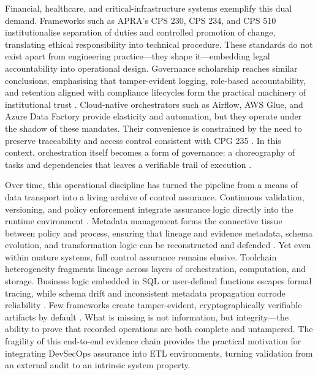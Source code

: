 Financial, healthcare, and critical-infrastructure systems exemplify this dual
demand. Frameworks such as APRA’s CPS 230, CPS 234, and CPS 510
\cite{cps230, cps234, cps510} institutionalise separation of duties and
controlled promotion of change, translating ethical responsibility into
technical procedure. These standards do not exist apart from engineering
practice—they shape it—embedding legal accountability into operational design.
Governance scholarship reaches similar conclusions, emphasising that
tamper-evident logging, role-based accountability, and retention aligned with
compliance lifecycles form the practical machinery of institutional trust
\cite{elbaghazaoui_ensuring_2025, elbaghazaoui_metadata_2025,
elbaghazaoui_data_2025}. Cloud-native orchestrators such as Airflow, AWS Glue,
and Azure Data Factory provide elasticity and automation, but they operate under
the shadow of these mandates. Their convenience is constrained by the need to
preserve traceability and access control consistent with CPG 235
\cite{australian_prudential_regulation_authority_prudential_2013}. In this
context, orchestration itself becomes a form of governance: a choreography of
tasks and dependencies that leaves a verifiable trail of execution
\cite{pogiatzis_event-driven_2021}.

Over time, this operational discipline has turned the pipeline from a means of
data transport into a living archive of control assurance. Continuous
validation, versioning, and policy enforcement integrate assurance logic
directly into the runtime environment \cite{elbaghazaoui_ensuring_2025}.
Metadata management forms the connective tissue between policy and process,
ensuring that lineage and evidence metadata, schema evolution, and
transformation logic can be reconstructed and defended
\cite{elbaghazaoui_metadata_2025}. Yet even within mature systems, full control
assurance remains elusive. Toolchain heterogeneity fragments lineage across
layers of orchestration, computation, and storage. Business logic embedded in
SQL or user-defined functions escapes formal tracing, while schema drift and
inconsistent metadata propagation corrode reliability
\cite{mahmud_role_2022}. Few frameworks create tamper-evident, cryptographically
verifiable artifacts by default
\cite{elbaghazaoui_metadata_2025, weigand_auditability_2019}. What is missing is
not information, but integrity—the ability to prove that recorded operations are
both complete and untampered. The fragility of this end-to-end evidence chain
provides the practical motivation for integrating DevSecOps assurance into ETL
environments, turning validation from an external audit to an intrinsic system
property.

